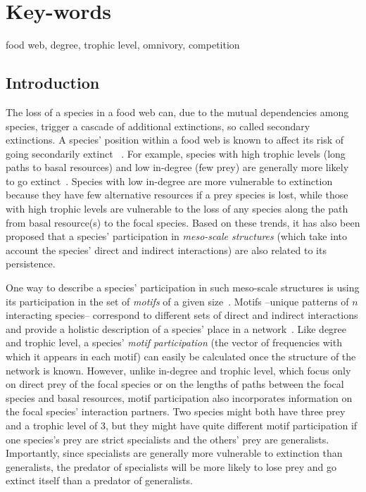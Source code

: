 \documentclass[12pt]{article}
\begin{document}
\section*{Key-words}
    food web, degree, trophic level, omnivory, competition


\begin{spacing}{2.0}
\linenumbers

\section*{Introduction} %

    The loss of a species in a food web can, due to the mutual dependencies among species,  trigger a cascade of additional extinctions, so called secondary extinctions. A species' position within a food web is known to affect its risk of going secondarily extinct ~\citep{Santos2021,curtsdotter2011robustness, dunne2009cascading, Eklof2006}.
    For example, species with high trophic levels (long paths to basal resources) and low in-degree (few prey) are generally more likely to go extinct~\citep{binzer2011susceptibility, Eklof2006}.
    Species with low in-degree are more vulnerable to extinction because they have few alternative resources if a prey species is lost, while those with high trophic levels are vulnerable to the loss of any species along the path from basal resource(s) to the focal species.
    Based on these trends, it has also been proposed that a species' participation in \emph{meso-scale structures} (which take into account the species' direct and indirect interactions) are also related to its persistence.
    
    
    One way to describe a species' participation in such meso-scale structures is using its participation in the set of \emph{motifs} of a given size~\citep{Cirtwill2015a,Cirtwill2018FoodWebs}.
    Motifs --unique patterns of $n$ interacting species-- correspond to different sets of direct and indirect interactions and provide a holistic description of a species' place in a network~\citep{Stouffer2007,Stouffer2012}.
    Like degree and trophic level, a species' \emph{motif participation} (the vector of frequencies with which it appears in each motif) can easily be calculated once the structure of the network is known.
    However, unlike in-degree and trophic level, which focus only on direct prey of the focal species or on the lengths of paths between the focal species and basal resources, motif participation also incorporates information on the focal species' interaction partners.
    Two species might both have three prey and a trophic level of 3, but they might have quite different motif participation if one species's prey are strict specialists and the others' prey are generalists.
    Importantly, since specialists are generally more vulnerable to extinction than generalists, the predator of specialists will be more likely to lose prey and go extinct itself than a predator of generalists.
    

\end{spacing}
\end{document}
